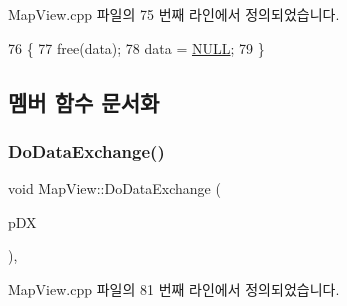 Map\+View.\+cpp 파일의 75 번째 라인에서 정의되었습니다.


\begin{DoxyCode}
76 \{
77   free(data);
78   data = \mbox{\hyperlink{getopt1_8c_a070d2ce7b6bb7e5c05602aa8c308d0c4}{NULL}};
79 \}
\end{DoxyCode}


\subsection{멤버 함수 문서화}
\mbox{\label{class_map_view_aee4e07be36ab0fbfe2c268d149c40e98}} 
\subsubsection{\texorpdfstring{Do\+Data\+Exchange()}{DoDataExchange()}}
{\footnotesize\ttfamily void Map\+View\+::\+Do\+Data\+Exchange (\begin{DoxyParamCaption}\item[{C\+Data\+Exchange $\ast$}]{p\+DX }\end{DoxyParamCaption})\hspace{0.3cm}{\ttfamily [protected]}, {\ttfamily [virtual]}}



Map\+View.\+cpp 파일의 81 번째 라인에서 정의되었습니다.


